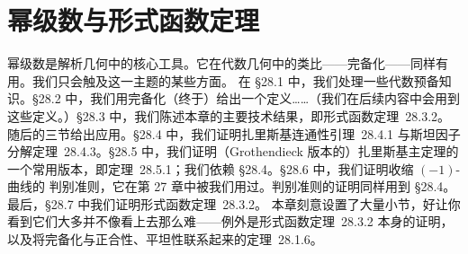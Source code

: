 
\chapter{幂级数与形式函数定理}
\label{ch:formal-functions}

幂级数是解析几何中的核心工具。它在代数几何中的类比——完备化——同样有用。我们只会触及这一主题的某些方面。
在 \S28.1 中，我们处理一些代数预备知识。\S28.2 中，我们用完备化（终于）给出一个定义……（我们在后续内容中会用到这些定义。）\S28.3 中，我们陈述本章的主要技术结果，即\mbox{形式函数定理~28.3.2}。随后的三节给出应用。\S28.4 中，我们证明\mbox{扎里斯基连通性引理~28.4.1} 与\mbox{斯坦因子分解定理~28.4.3}。\S28.5 中，我们证明（Grothendieck 版本的）扎里斯基主定理的一个常用版本，即\mbox{定理~28.5.1}；我们依赖 \S28.4。\S28.6 中，我们证明收缩 $(-1)$-曲线的 \trCastelnuovo{}判别准则，它在第 27 章中被我们用过。\trCastelnuovo{}判别准则的证明同样用到 \S28.4。最后，\S28.7 中我们证明\mbox{形式函数定理~28.3.2}。
本章刻意设置了大量小节，好让你看到它们大多并不像看上去那么难——例外是\mbox{形式函数定理~28.3.2} 本身的证明，以及将完备化与正合性、平坦性联系起来的\mbox{定理~28.1.6}。








